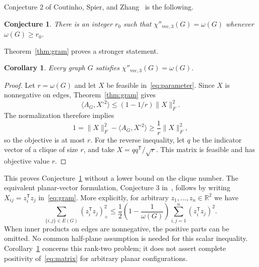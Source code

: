 \documentclass[11pt]{article}
\newtheorem{corollary}[theorem]{Corollary}
\newtheorem{conjecture}[theorem]{Conjecture}
\theoremstyle{remark}
\newcommand{\R}{\mathbb R}
\newcommand{\ip}[2]{\langle #1,#2\rangle}
\newcommand{\fro}[1]{\lVert #1\rVert_F}
\begin{document}
Conjecture 2 of Coutinho, Spier, and Zhang~\cite{CSZ} is the following.
\begin{conjecture}\label{conj:CSZ}
There is an integer $r_0$ such that
$\chi''_{\mathrm{vec},3}(G)=\omega(G)$ whenever $\omega(G)\ge r_0$.
\end{conjecture}

Theorem~\ref{thm:gram} proves a stronger statement.
\begin{corollary}\label{cor:parameter}
Every graph $G$ satisfies $\chi''_{\mathrm{vec},3}(G)=\omega(G)$.
\end{corollary}
\begin{proof}
Let $r=\omega(G)$ and let $X$ be feasible in~\eqref{eq:parameter}.
Since $X$ is nonnegative on edges, Theorem~\ref{thm:gram} gives
\[
 \ip{A_G}{X^{\circ2}}\le(1-1/r)\fro{X}^2.
\]
The normalization therefore implies
\[
 1=\fro{X}^2-\ip{A_G}{X^{\circ2}}\ge\frac1r\fro{X}^2,
\]
so the objective is at most $r$.
For the reverse inequality, let $q$ be the indicator vector of a clique of
size $r$, and take $X=qq^{\mathsf T}/\sqrt r$.
This matrix is feasible and has objective value $r$.
\end{proof}

This proves Conjecture~\ref{conj:CSZ} without a lower bound on the clique
number. The equivalent planar-vector formulation, Conjecture 3 in~\cite{CSZ},
follows by writing $X_{ij}=z_i^{\mathsf T}z_j$ in~\eqref{eq:gram}.
More explicitly, for arbitrary $z_1,\ldots,z_n\in\R^2$ we have
\[
 \sum_{\{i,j\}\in E(G)}(z_i^{\mathsf T}z_j)_+^2
 \le\frac12\left(1-\frac1{\omega(G)}\right)
             \sum_{i,j=1}^n(z_i^{\mathsf T}z_j)^2.
\]
When inner products on edges are nonnegative, the positive parts can be
omitted. No common half-plane assumption is needed for this scalar inequality.
Corollary~\ref{cor:parameter} concerns this rank-two problem; it does not assert
complete positivity of~\eqref{eq:matrix} for arbitrary planar configurations.
\end{document}
